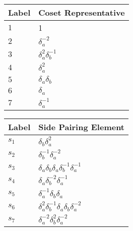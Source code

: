 \documentclass{article}
\begin{document}

\begin{center}
\begin{tabular}{ll}
\toprule
Label & Coset Representative\\
\midrule
$1$ & 1 \\
$2$ & $\delta_a^{-2}$ \\
$3$ & $\delta_a^{2}\delta_b^{-1}$ \\
$4$ & $\delta_a^{2}$ \\
$5$ & $\delta_a^{}\delta_b^{}$ \\
$6$ & $\delta_a^{}$ \\
$7$ & $\delta_a^{-1}$ \\
\bottomrule
\end{tabular}
\hfill
\begin{tabular}{ll}
\toprule
Label & Side Pairing Element\\
\midrule
$s_{1}$ & $\delta_b^{}\delta_a^{2}$ \\
$s_{2}$ & $\delta_b^{-1}\delta_a^{-2}$ \\
$s_{3}$ & $\delta_a^{}\delta_b^{}\delta_a^{}\delta_b^{-1}\delta_a^{-1}$ \\
$s_{4}$ & $\delta_a^{}\delta_b^{-2}\delta_a^{-1}$ \\
$s_{5}$ & $\delta_a^{-1}\delta_b^{}\delta_a^{}$ \\
$s_{6}$ & $\delta_a^{2}\delta_b^{-1}\delta_a^{}\delta_b^{}\delta_a^{-2}$ \\
$s_{7}$ & $\delta_a^{-2}\delta_b^{2}\delta_a^{-2}$ \\
\bottomrule
\end{tabular}
\end{center}

\thispagestyle{empty}
\end{document}
